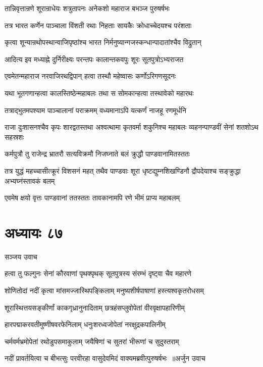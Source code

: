 \twolineshloka
{तान्निवृत्तान्रणे शूरान्राधेयः शत्रुतापनः}
{अनेकशो महाराज बभञ्ज पुरुषर्षभः}


\twolineshloka
{तत्र भारत कर्णेन पाञ्चाला विंशती रथाः}
{निहताः सायकैः क्रोधाच्चेदयश्च परंशताः}


\twolineshloka
{कृत्वा शून्यान्रथोपस्थान्वाजिपृष्ठांश्च भारत}
{निर्मनुष्यान्गजस्कन्धान्पादातांश्चैव विद्रुतान्}


\twolineshloka
{आदित्य इव मध्याह्ने दुर्निरीक्ष्यः परन्तपः}
{कालान्तकवपुः शूरः सूतपुत्रोऽभ्यराजत}


\twolineshloka
{एवमेतन्महाराज नरवाजिरथद्विपान्}
{हत्वा तस्थौ महेष्वासः कर्णोऽरिगणसूदनः}


\twolineshloka
{यथा भूतगणान्हत्वा कालस्तिष्ठेन्महाबलः}
{तथा स सोमकान्हत्वा तस्थावेको महारथः}


\twolineshloka
{तत्राद्भुतमपश्याम पाञ्चालानां पराक्रमम्}
{वध्यमानाऽपि यत्कर्णं नाजहू रणमूर्धनि}


\threelineshloka
{राजा दुःशासनश्चैव कृपः शारद्वतस्तथा}
{अश्वत्थामा कृतवर्मा शकुनिश्च महाबलः}
{व्यहनन्पाण्डवीं सेनां शतशोऽथ सहस्रशः}


\twolineshloka
{कर्मपुत्रौ तु राजेन्द्र भ्रातरौ सत्यविक्रमौ}
{निजघ्नाते बलं क्रुद्धौ पाण्डवानामितस्ततः}


तत्र युद्धं महच्चासीत्क्रूरं विशसनं महत्
\twolineshloka
{तथैव पाण्डवाः शूरा धृष्टद्युम्नशिखण्डिनौ}
{द्रौपदेयाश्च सङ्क्रुद्धा अभ्यघ्नंस्तावकं बलम्}


\twolineshloka
{एवमेष क्षयो वृत्तः पाण्डवानां ततस्ततः}
{तावकानामपि रणे भीमं प्राप्य महाबलम्}


\chapter{अध्यायः ८७}
\twolineshloka
{सञ्जय उवाच}
{}


\twolineshloka
{हत्वा तु फल्गुनः सेनां कौरवाणां पृथक्पृथक्}
{सूतपुत्रस्य संरम्भं दृष्ट्वा चैव महारणे}


\twolineshloka
{शोणितोदां नदीं कृत्वा मांसमज्जास्थिपङ्किलाम्}
{मनुष्यशीर्षपाषाणां हस्त्यश्वकृतरोधसम्}


\twolineshloka
{शूरास्थित्तयसङ्कीर्णां काकगृध्रानुनादिताम्}
{छत्रहंसप्लुवोपेतां वीरवृक्षापहारिणीम्}


\twolineshloka
{हारपद्माकरवतीमुष्णीषवरफेनिलाम्}
{धनुःशरध्वजोपेतां नरक्षुद्रकपालिनीम्}


\twolineshloka
{चर्मवर्मभ्रमोपेतां रथोडुपसमाकुलाम्}
{जयैषिणां च सुतरां भीरूणां च सुदुस्तराम्}


\threelineshloka
{नदीं प्रावर्तयित्वा च बीभत्सुः परवीरहा}
{वासुदेवमिदं वाक्यमब्रवीत्पुरुषर्षभः ॥अर्जुन उवाच}
{}


